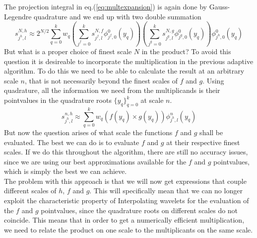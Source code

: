 \noindent
The projection integral in eq.(\ref{eq:multexpansion}) is again done by
Gauss-Legendre quadrature and we end up with two double summation
\begin{equation}
	s^{N,h}_{j^h,l} \approx
	2^{N/2}\sum_{q=0}^k w_q 
	\left(\sum_{j^f=0}^ks^{N,f}_{j^f,l}\phi^0_{j^f,0}(y_q)\right)
	\left(\sum_{j^g=0}^ks^{N,g}_{j^g,l}\phi^0_{j^g,0}(y_q)\right)
	\phi^0_{j^h,0}(y_q)
	\label{eq:Nmult}
\end{equation}
But what is a proper choice of finest scale $N$ in the product? To avoid this
question it is desireable to incorporate the multiplication in the previous
adaptive algorithm. To do this we need to be able to calculate the result
at an arbitrary scale $n$, that is not necessarily beyond the finest scales of
$f$ and $g$.  Using quadrature, all the information we need from the
multiplicands is their pointvalues in the quadrature roots $\lbrace
y_q\rbrace_{q=0}^k$ at scale $n$.
\begin{equation}
	s^{n,h}_{j^h,l} \approx \sum_{q=0}^k w_q\left(f(y_q)\times g(y_q)\right)
	\phi^n_{j^h,l}(y_q)
\end{equation}
But now the question arises of what scale the functions $f$ and $g$ shall be 
evaluated. The best we can do is 
to evaluate $f$ and $g$ at their respective finest scales. If we do this
throughout the algorithm, there are still no accuracy issues, since we are
using our best approximations available for the $f$ and $g$ pointvalues, which
is simply the best we can achieve.\\

\noindent
The problem with this approach is that we will now get expressions that couple
different scales of $h$, $f$ and $g$. This will specifically mean that we can
no longer exploit the characteristic property of Interpolating wavelets for
the evaluation of the $f$ and $g$ pointvalues, since the quadrature roots on
different scales do not coincide. This means that in order to get a
numerically efficient multiplication, we need to relate the product on one
scale to the multiplicants on the same scale. 

